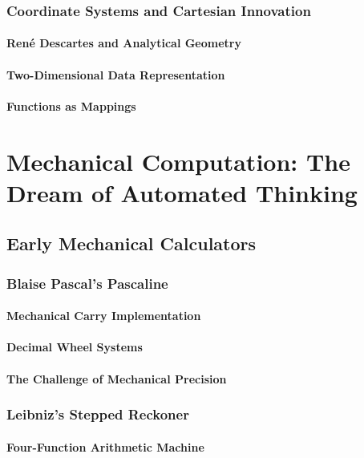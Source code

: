 \documentclass[12pt, oneside]{book}
\begin{document}
\subsection{Coordinate Systems and Cartesian Innovation}
\subsubsection{René Descartes and Analytical Geometry}
\subsubsection{Two-Dimensional Data Representation}
\subsubsection{Functions as Mappings}


\chapter{Mechanical Computation: The Dream of Automated Thinking}

\section{Early Mechanical Calculators}
\subsection{Blaise Pascal's Pascaline}
\subsubsection{Mechanical Carry Implementation}
\subsubsection{Decimal Wheel Systems}
\subsubsection{The Challenge of Mechanical Precision}

\subsection{Leibniz's Stepped Reckoner}
\subsubsection{Four-Function Arithmetic Machine}
\end{document}
